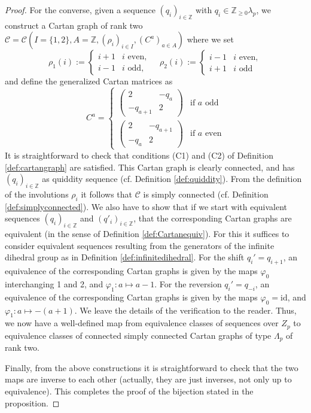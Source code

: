 \documentclass[11pt,a4paper]{amsart}
\theoremstyle{definition}
\numberwithin{equation}{section}
\newcommand{\rfl }{\rho }
\newcommand{\Cc }{\mathcal{C}}
\begin{document}
\begin{proof}
For the converse, given a sequence $(q_i)_{i\in\mathbb{Z}}$ with 
$q_i\in \mathbb{Z}_{\ge 0}\lambda_p$, we construct a Cartan graph of rank two
$\Cc=\Cc (I=\{1,2\},A=\mathbb{Z},(\rfl _i)_{i\in I},(C^a)_{a\in A})$ where we set
$$
\rho_1(i) := \begin{cases}
i+1 & i \text{ even}, \\
i-1 & i \text{ odd},
\end{cases}
\quad
\rho_2(i) := \begin{cases}
i-1 & i \text{ even}, \\
i+1 & i \text{ odd}
\end{cases}
$$
and define the generalized Cartan matrices as
$$
C^a = \left\{ \begin{array}{ll}
\begin{pmatrix} 2 & -q_a \\ -q_{a+1} & 2 
\end{pmatrix} & \textrm{if $a$ odd} \\
\begin{pmatrix} 2 & -q_{a+1} \\ -q_{a} & 2 
\end{pmatrix} & \textrm{if $a$ even} 
\end{array}
\right.
$$
It is straightforward to check that conditions
(C1) and (C2) of Definition \ref{def:cartangraph}
are satisfied.
This Cartan graph is clearly connected, and has $(q_i)_{i\in\mathbb{Z}}$ as quiddity sequence
(cf. Definition \ref{def:quiddity}).
From the definition of the involutions $\rho_i$
it follows that $\Cc$ is simply connected
(cf. Definition \ref{def:simplyconnected}).
We also have to show that if we start with 
equivalent sequences $(q_i)_{i\in \mathbb{Z}}$
and $(q'_i)_{i\in \mathbb{Z}}$, that the 
corresponding Cartan graphs are equivalent (in the
sense of Definition \ref{def:Cartanequiv}).
For this it suffices to consider equivalent 
sequences resulting from the generators 
of the infinite dihedral group as in Definition 
\ref{def:infinitedihedral}. For the shift 
$q_i'=q_{i+1}$, 
an equivalence of the corresponding
Cartan graphs is given by the maps $\varphi_0$
interchanging 1 and 2, and $\varphi_1:a\mapsto 
a-1$. For the reversion $q_i'=q_{-i}$,
an equivalence of the corresponding
Cartan graphs is given by the maps $\varphi_0=
\mathrm{id}$, and $\varphi_1:a\mapsto -(a+1)$.
We leave the details of the verification to
the reader. Thus, we now have a well-defined
map from equivalence classes of sequences 
over $Z_p$ to equivalence classes of 
connected simply connected Cartan graphs of
type $\Lambda_p$ of rank two. 
\smallskip

Finally, from the above constructions it is 
straightforward to check that the two maps 
are inverse to each other (actually, they are
just inverses, not only up to equivalence). 
This completes the proof of the bijection
stated in the proposition. 
\end{proof}
\medskip
\end{document}
